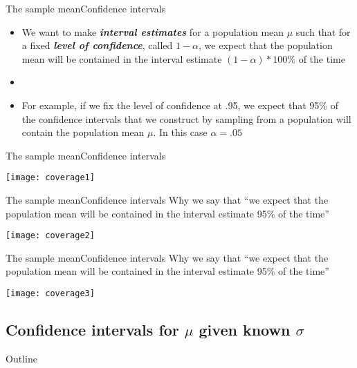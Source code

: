 \documentclass[xcolor=dvipsnames]{beamer}
\begin{document}
\begin{frame}{The sample mean}{Confidence intervals}
	\begin{itemize}
		\item We want to make \textbf{\emph{interval estimates}} for a population mean $\mu$ such that for a fixed \textbf{\emph{level of confidence}}, called $1-\alpha$,
		we expect that the population mean will be contained in the interval estimate $(1-\alpha) * 100 \%$ of the time
		\item[]
		\item For example, if we fix the level of confidence at .95, we expect that 95\% of the confidence intervals that we construct by sampling from a population will contain the population mean $\mu$. In this case $\alpha = .05$
	\end{itemize}
\end{frame}

\begin{frame}{The sample mean}{Confidence intervals}
	\begin{center}
		\texttt{[image: coverage1]}
	\end{center}
\end{frame}

\begin{frame}{The sample mean}{Confidence intervals}
	Why we say that ``we expect that the population mean will be contained in the interval estimate 95\% of the time''
	\begin{center}
		\texttt{[image: coverage2]}
	\end{center}
\end{frame}

\begin{frame}{The sample mean}{Confidence intervals}
	Why we say that ``we expect that the population mean will be contained in the interval estimate 95\% of the time''
	\begin{center}
		\texttt{[image: coverage3]}
	\end{center}
\end{frame}

\subsection{Confidence intervals for $\mu$ given known $\sigma$}
\begin{frame}{Outline}
	\tableofcontents[currentsection,subsectionstyle=show/shaded/hide]
\end{frame}
\end{document}
